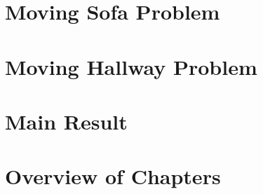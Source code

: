 
\section{Moving Sofa Problem}
\label{sec:moving-sofa-problem}


\section{Moving Hallway Problem}
\label{sec:moving-hallway-problem}


\section{Main Result}
\label{sec:main-result}


\section{Overview of Chapters}
\label{sec:overview-of-chapters}


